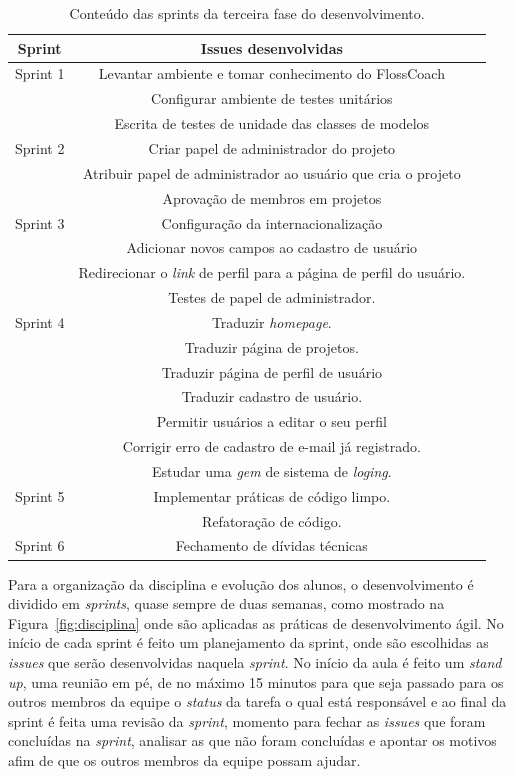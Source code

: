 \begin{table}[h]
	\centering
	\begin{tabular}{ccc}
		\toprule
		\textbf{Sprint} & \textbf{Issues desenvolvidas} \\
		\midrule
		Sprint 1 & Levantar ambiente e tomar conhecimento do FlossCoach \\
			 & Configurar ambiente de testes unitários \\
			 & Escrita de testes de unidade das classes de modelos\\
		\midrule
		Sprint 2 & Criar papel de administrador do projeto\\
			 & Atribuir papel de administrador ao usuário que cria o projeto \\
			 & Aprovação de membros em projetos \\
		\midrule		
		Sprint 3 & Configuração da internacionalização \\
			 & Adicionar novos campos ao cadastro de usuário\\
			 & Redirecionar o \textit{link} de perfil para a página de perfil do usuário.\\
			 & Testes de papel de administrador.\\
		\midrule		
		Sprint 4 & Traduzir \textit{homepage}.\\
			 & Traduzir página de projetos.\\
			 & Traduzir página de perfil de usuário\\
			 & Traduzir cadastro de usuário.\\ 
			 & Permitir usuários a editar o seu perfil\\
			 & Corrigir erro de cadastro de e-mail já registrado.\\
			 & Estudar uma \textit{gem} de sistema de \textit{loging}.\\  
		\midrule		
		Sprint 5 & Implementar práticas de código limpo.\\
			 & Refatoração de código.\\
	
		\midrule
		Sprint 6 & Fechamento de dívidas técnicas\\
		\bottomrule
	\end{tabular}

	\caption{Conteúdo das sprints da terceira fase do desenvolvimento.}
	\label{issues}
\end{table}

Para a organização da disciplina e evolução dos alunos, o desenvolvimento é dividido
em \textit{sprints}, quase sempre de duas semanas, como mostrado na Figura~\ref{fig:disciplina}
onde são aplicadas as práticas de desenvolvimento ágil. No início de cada sprint é feito um planejamento da sprint, 
onde são escolhidas as \textit{issues} que serão desenvolvidas naquela \textit{sprint}.
No início da aula é feito um \textit{stand up}, uma reunião em pé, de no máximo 15
minutos para que seja passado para os outros membros da equipe o \textit{status} da
tarefa o qual está responsável e ao final da sprint é feita uma revisão da \textit{sprint},
momento para fechar as \textit{issues} que foram concluídas na \textit{sprint}, 
analisar as que não foram concluídas e apontar os motivos afim de que os outros membros
da equipe possam ajudar.

